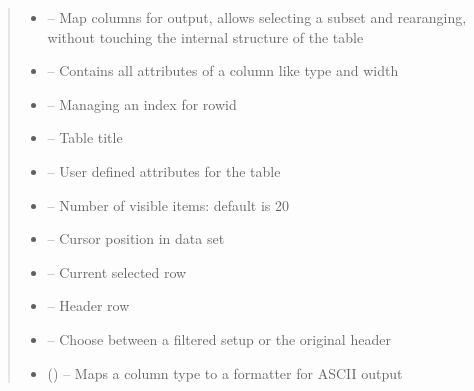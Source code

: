 \documentclass[letterpaper,10pt,english]{sphinxmanual}
\begin{document}
\begin{savenotes}
\begin{fulllineitems}
\begin{quote}
\begin{description}
\begin{itemize}
\item {} 
\sphinxAtStartPar
{} – Map columns for output, allows selecting a subset and rearanging, without touching    the internal structure of the table

\item {} 
\sphinxAtStartPar
{} – Contains all attributes of a column like type and width

\item {} 
\sphinxAtStartPar
{} – Managing an index for row\sphinxhyphen{}id

\item {} 
\sphinxAtStartPar
{} – Table title

\item {} 
\sphinxAtStartPar
{} – User defined attributes for the table

\item {} 
\sphinxAtStartPar
{} – Number of visible items: default is 20

\item {} 
\sphinxAtStartPar
{} – Cursor position in data set

\item {} 
\sphinxAtStartPar
{} – Current selected row

\item {} 
\sphinxAtStartPar
{} – Header row

\item {} 
\sphinxAtStartPar
{} – Choose between a filtered setup or the original header

\item {} 
\sphinxAtStartPar
{} (\sphinxstyleliteralemphasis{\sphinxupquote{{[}}}\sphinxstyleliteralemphasis{\sphinxupquote{{[}}}\sphinxstyleliteralemphasis{\sphinxupquote{,}}\sphinxstyleliteralemphasis{\sphinxupquote{{]}}}\sphinxstyleliteralemphasis{\sphinxupquote{{]}}}) – Maps a column type to a formatter for ASCII output


\end{itemize}
\end{description}
\end{quote}
\end{fulllineitems}
\end{savenotes}
\end{document}
